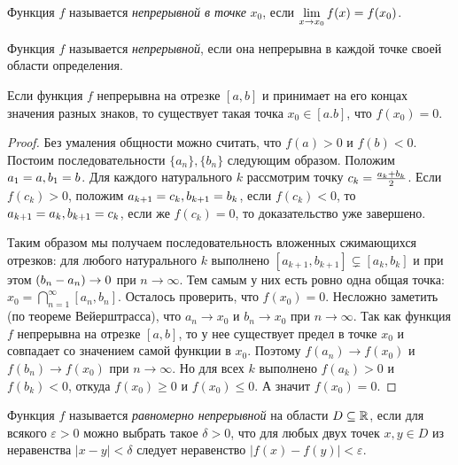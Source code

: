 \begin{defin}
	Функция \(f\) называется\textit{ непрерывной в точке }\(x_0\), если \(\lim\limits_{x\to x_0}f(x) \hm=f(x_0)\).
\end{defin}
\begin{defin}
	Функция \(f\) называется\textit{ непрерывной}, если она непрерывна в каждой точке своей области определения.
\end{defin}

\begin{theorem}
	Если функция \(f\) непрерывна на отрезке \([a,b]\) и принимает на его концах значения разных знаков, то существует такая точка \(x_0\in [a.b]\), что \(f(x_0) = 0\).
\end{theorem}
\begin{proof}
	Без умаления общности можно считать, что \(f(a) > 0\) и \(f(b)<0\). Постоим последовательности \(\{a_n\}, \{b_n\}\) следующим образом. Положим \(a_1\hm= a, b_1 \hm= b\).
	Для каждого натурального \(k\) рассмотрим точку \(c_k \hm= \tfrac{a_k + b_k}{2}\). Если \(f(c_k) > 0\), положим \(a_{k+1}\hm=c_k, b_{k+1}\hm=b_k\), если \(f(c_k) < 0\), то \(a_{k+1}\hm=a_k, b_{k+1}\hm=c_k\), если же \(f(c_k)=0\), то доказательство уже завершено.
	
	Таким образом мы получаем последовательность вложенных сжимающихся отрезков:
	для любого натурального \(k\) выполнено \([a_{k+1}, b_{k+1}]\subsetneq[a_k, b_k]\) и при этом \((b_n\hm-a_n)\to0\) при \(n\to\infty\).
	Тем самым у них есть ровно одна общая точка: \(x_0 = \bigcap\limits_{n=1}^{\infty}[a_n, b_n]\). Осталось проверить, что \(f(x_0) = 0\). Несложно заметить (по теореме Вейерштрасса), что \(a_n\to x_0\) и \(b_n\to x_0\) при \(n\to\infty\). Так как функция \(f\) непрерывна на отрезке \([a, b]\), то у нее существует предел в точке \(x_0\) и совпадает со значением самой функции в \(x_0\). Поэтому \(f(a_n)\to f(x_0)\) и \(f(b_n)\to f(x_0)\) при \(n\to\infty\). Но для всех \(k\) выполнено \(f(a_k) > 0\) и \(f(b_k) < 0\), откуда \(f(x_0)\geqslant0\) и \(f(x_0)\leqslant0\). А значит \(f(x_0) = 0\).
\end{proof}

\begin{defin}
	Функция \(f\) называется \textit{равномерно непрерывной} на области \(D\subseteq\mathbb{R}\), если для всякого \(\varepsilon>0\) можно выбрать такое \(\delta>0\), что для любых двух точек \(x, y\in D\) из неравенства \(|x-y|<\delta\) следует неравенство \(|f(x) - f(y)|<\varepsilon\).
\end{defin}

